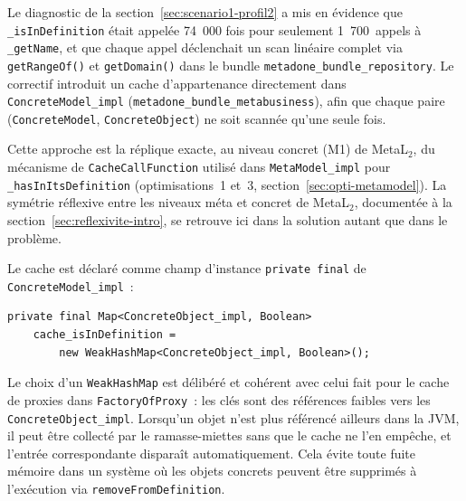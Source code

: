 Le diagnostic de la section~\ref{sec:scenario1-profil2} a mis en évidence
que \texttt{\_isInDefinition} était appelée 74~000 fois pour seulement
1~700~appels à \texttt{\_getName}, et que chaque appel déclenchait un scan
linéaire complet via \texttt{getRangeOf()} et \texttt{getDomain()} dans
le bundle \texttt{metadone\_bundle\_repository}. Le correctif introduit un cache
d'appartenance directement dans \texttt{ConcreteModel\_impl}
(\texttt{metadone\_bundle\_metabusiness}), afin que chaque paire
(\texttt{ConcreteModel}, \texttt{ConcreteObject}) ne soit scannée qu'une
seule fois.

Cette approche est la réplique exacte, au niveau concret (M1) de
MetaL$_2$, du mécanisme de \texttt{CacheCallFunction} utilisé dans
\texttt{MetaModel\_impl} pour \texttt{\_hasInItsDefinition}
(optimisations~1 et~3, section~\ref{sec:opti-metamodel}). La symétrie
réflexive entre les niveaux méta et concret de MetaL$_2$, documentée
à la section~\ref{sec:reflexivite-intro}, se retrouve ici dans la
solution autant que dans le problème.

Le cache est déclaré comme champ d'instance \texttt{private final} de
\texttt{ConcreteModel\_impl}~:

\begin{lstlisting}[firstnumber=42,
  caption={Déclaration du cache dans \texttt{ConcreteModel\_impl} ---
  bundle \texttt{metadone\_bundle\_metabusiness}.},
  label={ls-cache-isin}]
private final Map<ConcreteObject_impl, Boolean>
    cache_isInDefinition =
        new WeakHashMap<ConcreteObject_impl, Boolean>();
\end{lstlisting}

Le choix d'un \texttt{WeakHashMap} est délibéré et cohérent avec celui
fait pour le cache de proxies dans \texttt{FactoryOfProxy}~: les clés sont des références faibles vers
les \texttt{ConcreteObject\_impl}. Lorsqu'un objet n'est plus référencé
ailleurs dans la JVM, il peut être collecté par le ramasse-miettes sans
que le cache ne l'en empêche, et l'entrée correspondante disparaît
automatiquement. Cela évite toute fuite mémoire dans un système où les
objets concrets peuvent être supprimés à l'exécution via
\texttt{removeFromDefinition}.

